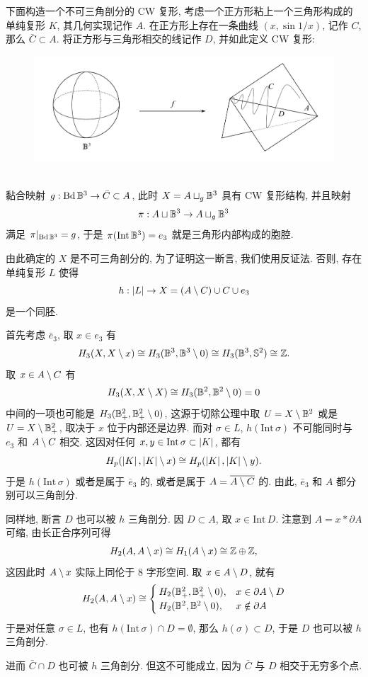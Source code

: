 \begin{Example}[不可三角剖分的 CW 复形]
	下面构造一个不可三角剖分的 CW 复形, 考虑一个正方形粘上一个三角形构成的单纯复形 $ K $, 其几何实现记作 $ A $. 在正方形上存在一条曲线 $ (x,\sin 1/x) $, 记作 $ C $, 那么 $ \bar{C}\subset A $. 将正方形与三角形相交的线记作 $ D $, 并如此定义 CW 复形:
	\begin{figure}[htbp]
		\centering
		\includegraphics[width=0.65\linewidth]{figures/Sec12-3.png}
	\end{figure}\\
	黏合映射 $ g : \mathrm{Bd}\,\mathbb{B}^3\to\bar{C}\subset A $, 此时 $ X=A\sqcup_g\mathbb{B}^3 $ 具有 CW 复形结构, 并且映射
	\[
		\pi : A\sqcup\mathbb{B}^3\to A\sqcup_g\mathbb{B}^3
	\]
	满足 $ \pi|_{\mathrm{Bd}\,\mathbb{B}^3}=g $, 于是 $ \pi(\mathrm{Int}\,\mathbb{B}^3)=e_3 $ 就是三角形内部构成的胞腔.

	由此确定的 $ X $ 是不可三角剖分的, 为了证明这一断言, 我们使用反证法. 否则, 存在单纯复形 $ L $ 使得
	\[
		h : \left| L \right| \to X=(A\setminus C)\cup C\cup e_3
	\]
	是一个同胚.

	首先考虑 $ \bar{e}_3 $, 取 $ x\in e_3 $ 有
	\[
		H_3(X,X\setminus x)\cong H_3(\mathbb{B}^3,\mathbb{B}^3\setminus 0)\cong H_3(\mathbb{B}^3,\mathbb{S}^2)\cong\mathbb{Z}.
	\]
	取 $ x\in A\setminus C $ 有
	\[
		H_3(X,X\setminus X)\cong H_3(\mathbb{B}^2,\mathbb{B}^2\setminus 0)=0
	\]
	中间的一项也可能是 $ H_3(\mathbb{B}_+^2,\mathbb{B}_+^2\setminus 0) $, 这源于切除公理中取 $ U=X\setminus\mathbb{B}^2 $ 或是 $ U=X\setminus \mathbb{B}_+^2 $, 取决于 $ x $ 位于内部还是边界. 而对 $ \sigma\in L $, $ h(\mathrm{Int}\,\sigma) $ 不可能同时与 $ e_3 $ 和 $ A\setminus C $ 相交. 这因对任何 $ x,y\in\mathrm{Int}\,\sigma\subset\left| K \right|  $, 都有
	\[
		H_p(\left| K \right| ,\left| K \right| \setminus x)\cong H_p(\left| K \right| ,\left| K \right| \setminus y).
	\]
	于是 $ h(\mathrm{Int}\,\sigma) $ 或者是属于 $ \bar{e}_3 $ 的, 或者是属于 $ A=\overline{A\setminus C} $ 的. 由此, $ \bar{e}_3 $ 和 $ A $ 都分别可以三角剖分.

	同样地, 断言 $ D $ 也可以被 $ h $ 三角剖分. 因 $ D\subset A $, 取 $ x\in\mathrm{Int}\,D $. 注意到 $ A=x*\partial A $ 可缩, 由长正合序列可得
	\[
		H_2(A,A\setminus x)\cong H_1(A\setminus x)\cong\mathbb{Z}\oplus\mathbb{Z},
	\]
	这因此时 $ A\setminus x $ 实际上同伦于 8 字形空间. 取 $ x\in A\setminus D $, 就有
	\[
		H_2(A,A\setminus x)\cong\begin{cases}
			H_2(\mathbb{B}_+^2,\mathbb{B}_+^2\setminus 0), &x\in\partial A\setminus D\\ H_2(\mathbb{B}^2,\mathbb{B}^2\setminus 0), &x\notin \partial A
		\end{cases}
	\]
	于是对任意 $ \sigma\in L $, 也有 $ h(\mathrm{Int}\,\sigma)\cap D=\emptyset $, 那么 $ h(\sigma)\subset D $, 于是 $ D $ 也可以被 $ h $ 三角剖分.

	进而 $ \bar{C}\cap D $ 也可被 $ h $ 三角剖分. 但这不可能成立, 因为 $ \bar{C} $ 与 $ D $ 相交于无穷多个点.
\end{Example}

